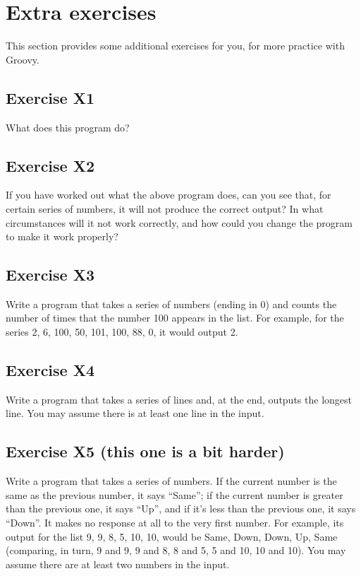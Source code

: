 \section{Extra exercises}
\label{sec:additional-exercises}

This section provides some additional exercises for you, for more
practice with Groovy.  

\subsection*{Exercise X1}

What does this program do?


\subsection*{Exercise X2}

If you have worked out what the above program does, can you
see that, for certain series of numbers, it will not produce the correct
output?  In what circumstances will it not work correctly, and how could
you change the program to make it work properly?

\subsection*{Exercise X3}

Write a program that takes a series of numbers (ending in 0) and counts
the number of times that the number 100 appears in the list.  For example,
for the series 2, 6, 100, 50, 101, 100, 88, 0, it would output 2.

\subsection*{Exercise X4}

Write a program that takes a series of lines and,
at the end, outputs the longest line.
You may assume there is at least one line in the input.

\subsection*{Exercise X5 (this one is a bit harder)}

Write a program that takes
a series of numbers.  If the
current number is the same as the previous number, it says ``Same'';
if the current number is greater than the previous one, it says ``Up'',
and if it's less than the previous one, it says ``Down''.
It makes no response at all to the
very first number.  For example, its output for the list 9, 9, 8, 5, 10, 10,
would be Same, Down, Down, Up, Same
(comparing, in turn, 9 and 9, 9 and 8, 8 and 5, 5 and 10, 10 and 10).
You may assume there are at least two numbers in the input.



